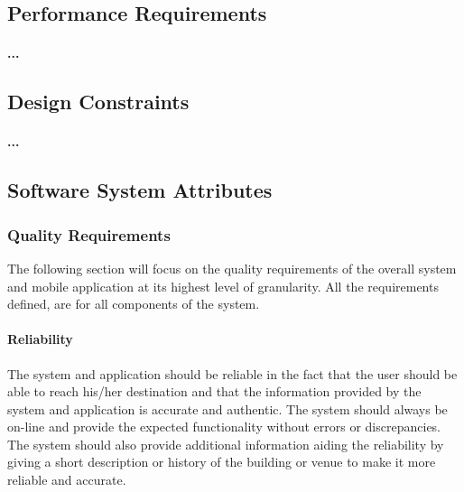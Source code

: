 \documentclass[runningheads,a4paper]{llncs}
\begin{document}
\subsection{Performance Requirements}
\paragraph{...}
\subsection{Design Constraints}
\paragraph{...}

 \subsection{Software System Attributes}
\subsubsection{Quality Requirements \\}
The following section will focus on the quality requirements of the overall system and mobile application at its highest level of granularity. All the requirements defined, are for all components of the system.

\paragraph{\textbf{Reliability} \\}
The system and application should be reliable in the fact that the user should be able to reach his/her destination and that the information provided by the system and application is accurate and authentic. The system should always be on-line and provide the expected functionality without errors or discrepancies. The system should also provide additional information aiding the reliability by giving a short description or history of the building or venue to make it more reliable and accurate. 
\end{document}
